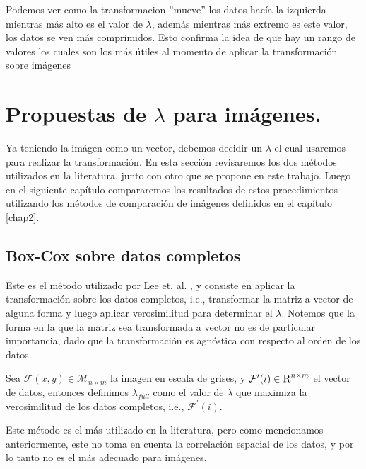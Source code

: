     Podemos ver como la transformacion ''mueve'' los datos hac\'ia la izquierda mientras m\'as alto es el valor de $\lambda$, adem\'as mientras m\'as extremo es este valor, los datos se ven m\'as comprimidos. Esto confirma la idea de que hay un rango de valores los cuales son los m\'as \'utiles al momento de aplicar la transformaci\'on sobre im\'agenes



    \section[Propuestas de lambda]{Propuestas de $\lambda$ para im\'agenes.}\label{}


    Ya teniendo la im\'agen como un vector, debemos decidir un $\lambda$ el cual usaremos para realizar la transformaci\'on. En esta secci\'on revisaremos los dos m\'etodos utilizados en la literatura, junto con otro que se propone en este trabajo. Luego en el siguiente cap\'itulo compararemos los resultados de estos procedimientos utilizando los m\'etodos de comparaci\'on de im\'agenes definidos en el cap\'itulo \ref{chap2}.


    \subsection{Box-Cox sobre datos completos}

    Este es el m\'etodo utilizado por Lee et. al. \cite{lee2009mr}, y consiste en aplicar la transformaci\'on sobre los datos completos, i.e., transformar la matriz a vector de alguna forma y luego aplicar verosimilitud para determinar el $\lambda$. Notemos que la forma en la que la matriz sea transformada a vector no es de particular importancia, dado que la transformaci\'on es agn\'ostica con respecto al orden de los datos. 

    \begin{defn}\label{lambda_full}
        Sea $\mathcal{F}(x, y)\in\mathcal{M}_{n\times m}$ la imagen en escala de grises, y $\mathcal{F}^{\prime}(i)\in\textsc{R}^{n\times m}$ el vector de datos, entonces definimos $\lambda_{full}$ como el valor de $\lambda$ que maximiza la verosimilitud de los datos completos, i.e., $\mathcal{F}^{\prime}(i)$.
    \end{defn}
    
    Este m\'etodo es el m\'as utilizado en la literatura, pero como mencionamos anteriormente, este no toma en cuenta la correlaci\'on espacial de los datos, y por lo tanto no es el m\'as adecuado para im\'agenes. 



